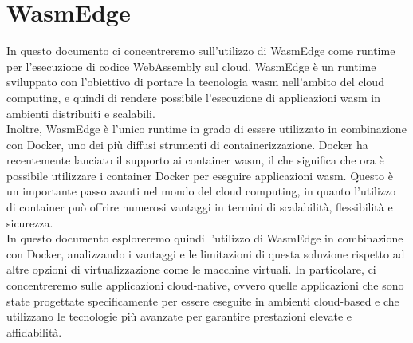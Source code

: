 \section{WasmEdge}
In questo documento ci concentreremo sull'utilizzo di WasmEdge come runtime per l'esecuzione di codice WebAssembly sul cloud. WasmEdge è un runtime sviluppato con l'obiettivo di portare la tecnologia wasm nell'ambito del cloud computing, e quindi di rendere possibile l'esecuzione di applicazioni wasm in ambienti distribuiti e scalabili.
\\
Inoltre, WasmEdge è l'unico runtime in grado di essere utilizzato in combinazione con Docker, uno dei più diffusi strumenti di containerizzazione. Docker ha recentemente lanciato il supporto ai container wasm, il che significa che ora è possibile utilizzare i container Docker per eseguire applicazioni wasm. Questo è un importante passo avanti nel mondo del cloud computing, in quanto l'utilizzo di container può offrire numerosi vantaggi in termini di scalabilità, flessibilità e sicurezza.
\\
In questo documento esploreremo quindi l'utilizzo di WasmEdge in combinazione con Docker, analizzando i vantaggi e le limitazioni di questa soluzione rispetto ad altre opzioni di virtualizzazione come le macchine virtuali. In particolare, ci concentreremo sulle applicazioni cloud-native, ovvero quelle applicazioni che sono state progettate specificamente per essere eseguite in ambienti cloud-based e che utilizzano le tecnologie più avanzate per garantire prestazioni elevate e affidabilità.
